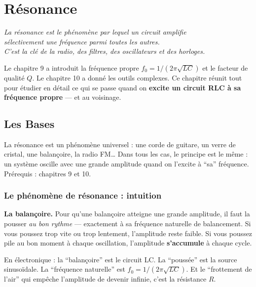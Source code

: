 \documentclass[12pt,a4paper,twoside]{book}
\begin{document}
\chapter{Résonance}

\begin{center}
\textit{La résonance est le phénomène par lequel un circuit amplifie\\
sélectivement une fréquence parmi toutes les autres.\\
C'est la clé de la radio, des filtres, des oscillateurs et des horloges.}
\end{center}

\vspace{0.5cm}

Le chapitre 9 a introduit la fréquence propre $f_0 = 1/(2\pi\sqrt{LC})$ et le facteur de qualité $Q$. Le chapitre 10 a donné les outils complexes. Ce chapitre réunit tout pour étudier en détail ce qui se passe quand on \textbf{excite un circuit RLC à sa fréquence propre} --- et au voisinage.

\section{Les Bases}

\begin{bases}
La résonance est un phénomène universel : une corde de guitare, un verre de cristal, une balançoire, la radio FM\ldots{} Dans tous les cas, le principe est le même : un système oscille avec une grande amplitude quand on l'excite à ``sa'' fréquence. Prérequis : chapitres 9 et 10.
\end{bases}

\subsection{Le phénomène de résonance : intuition}

\begin{analogie}
\textbf{La balançoire.} Pour qu'une balançoire atteigne une grande amplitude, il faut la pousser \textit{au bon rythme} --- exactement à sa fréquence naturelle de balancement. Si vous poussez trop vite ou trop lentement, l'amplitude reste faible. Si vous poussez pile au bon moment à chaque oscillation, l'amplitude \textbf{s'accumule} à chaque cycle.

En électronique : la ``balançoire'' est le circuit LC. La ``poussée'' est la source sinusoïdale. La ``fréquence naturelle'' est $f_0 = 1/(2\pi\sqrt{LC})$. Et le ``frottement de l'air'' qui empêche l'amplitude de devenir infinie, c'est la résistance $R$.
\end{analogie}
\end{document}
